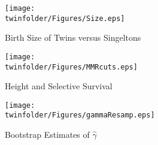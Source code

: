 \setcounter{figure}{0}
\renewcommand{\thefigure}{A\arabic{figure}}

\begin{figure}[htpb!]
\begin{center}
\caption{Birth Size of Twins versus Singeltons}
\label{TWINfig:Size}
\texttt{[image: \\twinfolder/Figures/Size.eps]} 
\end{center}
\end{figure}

\begin{figure}[htpb!]
\begin{center}
\caption{Height and Selective Survival}
\label{TWINfig:survival}
\texttt{[image: \\twinfolder/Figures/MMRcuts.eps]} 
\end{center}
\end{figure}

\begin{figure}[htpb!]
\begin{center}
\caption{Bootstrap Estimates of $\hat\gamma$}
\label{TWINfig:gammaBoots}
\texttt{[image: \\twinfolder/Figures/gammaResamp.eps]} 
\end{center}
\end{figure}

